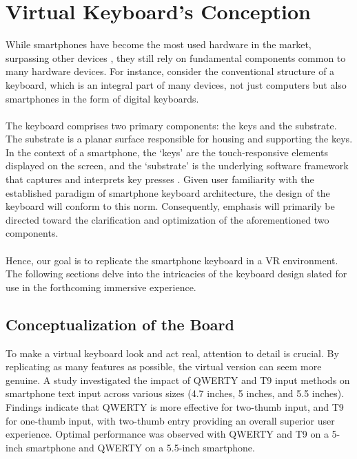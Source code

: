 \section{Virtual Keyboard’s Conception}
While smartphones have become the most used hardware in the market, surpassing other devices \cite{Laricchia2024}, they still rely on fundamental components common to many hardware devices. For instance, consider the conventional structure of a keyboard, which is an integral part of many devices, not just computers but also smartphones in the form of digital keyboards.\\ \\
The keyboard comprises two primary components: the keys and the substrate. The substrate is a planar surface responsible for housing and supporting the keys. In the context of a smartphone, the ‘keys’ are the touch-responsive elements displayed on the screen, and the ‘substrate’ is the underlying software framework that captures and interprets key presses \cite{Staff2022}. Given user familiarity with the established paradigm of smartphone keyboard architecture, the design of the keyboard will conform to this norm. Consequently, emphasis will primarily be directed toward the clarification and optimization of the aforementioned two components.\\ \\
Hence, our goal is to replicate the smartphone keyboard in a \ac{VR} environment. The following sections delve into the intricacies of the keyboard design slated for use in the forthcoming immersive experience.

\subsection{Conceptualization of the Board}

To make a virtual keyboard look and act real, attention to detail is crucial. By replicating as many features as possible, the virtual version can seem more genuine. A study \cite{Ying2021} investigated the impact of QWERTY and T9 \cite{T9} input methods on smartphone text input across various sizes (4.7 inches, 5 inches, and 5.5 inches). Findings indicate that QWERTY is more effective for two-thumb input, and T9 for one-thumb input, with two-thumb entry providing an overall superior user experience. Optimal performance was observed with QWERTY and T9 on a 5-inch smartphone and QWERTY on a 5.5-inch smartphone.

